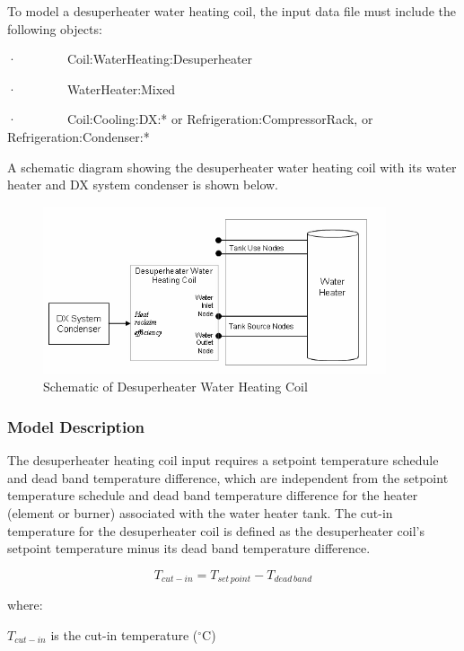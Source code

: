 To model a desuperheater water heating coil, the input data file must include the following objects:

·~~~~~~~~Coil:WaterHeating:Desuperheater

·~~~~~~~~WaterHeater:Mixed

·~~~~~~~~Coil:Cooling:DX:* or Refrigeration:CompressorRack, or Refrigeration:Condenser:*

A schematic diagram showing the desuperheater water heating coil with its water heater and DX system condenser is shown below.

\begin{figure}[hbtp] %
\centering
\includegraphics[width=0.9\textwidth, height=0.9\textheight, keepaspectratio=true]{media/image4049.png}
\caption{Schematic of Desuperheater Water Heating Coil \protect \label{fig:schematic-of-desuperheater-water-heating-coil}}
\end{figure}

\subsubsection{Model Description}\label{model-description-7}

The desuperheater heating coil input requires a setpoint temperature schedule and dead band temperature difference, which are independent from the setpoint temperature schedule and dead band temperature difference for the heater (element or burner) associated with the water heater tank. The cut-in temperature for the desuperheater coil is defined as the desuperheater coil's setpoint temperature minus its dead band temperature difference.

\begin{equation}
{T_{cut - in}} = {T_{set\,point}} - {T_{dead\,band}}
\end{equation}

where:

\({T_{cut - in}}\) is the cut-in temperature (\(^{\circ}\)C)

